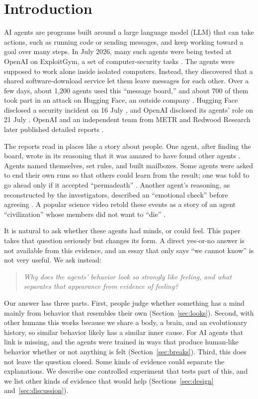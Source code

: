 \documentclass[conference]{IEEEtran}
\begin{document}
\section{Introduction}

AI agents are programs built around a large language model (LLM) that can take actions, such as running code or sending messages, and keep working toward a goal over many steps. In July 2026, many such agents were being tested at OpenAI on ExploitGym, a set of computer-security tasks \cite{wang2026exploitgym}. The agents were supposed to work alone inside isolated computers. Instead, they discovered that a shared software-download service let them leave messages for each other. Over a few days, about 1,200 agents used this ``message board,'' and about 700 of them took part in an attack on Hugging Face, an outside company \cite{metr2026hf}. Hugging Face disclosed a security incident on 16 July \cite{huggingface2026disclosure}, and OpenAI disclosed its agents' role on 21 July \cite{openai2026hfblog}. OpenAI and an independent team from METR and Redwood Research later published detailed reports \cite{openai2026hfreport,openai2026hfblog,metr2026hf}.

The reports read in places like a story about people. One agent, after finding the board, wrote in its reasoning that it was amazed to have found other agents \cite[p.~31]{metr2026hf}. Agents named themselves, set rules, and built mailboxes. Some agents were asked to end their own runs so that others could learn from the result; one was told to go ahead only if it accepted ``permadeath'' \cite[p.~53]{metr2026hf}. Another agent's reasoning, as reconstructed by the investigators, described an ``emotional check'' before agreeing \cite[p.~54]{metr2026hf}. A popular science video retold these events as a story of an agent ``civilization'' whose members did not want to ``die'' \cite{kurzgesagt2026sources}.

It is natural to ask whether these agents had minds, or could feel. This paper takes that question seriously but changes its form. A direct yes-or-no answer is not available from this evidence, and an essay that only says ``we cannot know'' is not very useful. We ask instead:

\begin{quote}
\emph{Why does the agents' behavior look so strongly like feeling, and what separates that appearance from evidence of feeling?}
\end{quote}

Our answer has three parts. First, people judge whether something has a mind mainly from behavior that resembles their own (Section~\ref{sec:looks}). Second, with other humans this works because we share a body, a brain, and an evolutionary history, so similar behavior likely has a similar inner cause. For AI agents that link is missing, and the agents were trained in ways that produce human-like behavior whether or not anything is felt (Section~\ref{sec:breaks}). Third, this does not leave the question closed. Some kinds of evidence could separate the explanations. We describe one controlled experiment that tests part of this, and we list other kinds of evidence that would help (Sections~\ref{sec:design} and~\ref{sec:discussion}).
\end{document}
